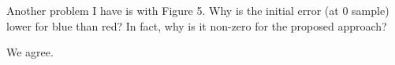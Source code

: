 \begin{reviewer}
Another problem I have is with Figure 5. Why is the initial error (at 0 sample)
lower for blue than red? In fact, why is it non-zero for the proposed approach?
\end{reviewer}

\begin{authors}
We agree.

\begin{actions}
\end{actions}
\end{authors}
